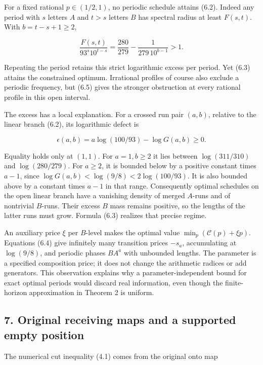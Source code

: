 For a fixed rational \(p\in(1/2,1)\), no periodic schedule attains (6.2). Indeed any period with \(s\) letters \(A\) and \(t>s\) letters \(B\) has spectral radius at least \(F(s,t)\). With \(b=t-s+1\ge2\),

\[
\boxed{
\frac{F(s,t)}{93^s10^{t-s}}
=\frac{280}{279}-\frac{1}{279\,10^{b-1}}>1.
}
\tag{6.5}
\]

Repeating the period retains this strict logarithmic excess per period. Yet (6.3) attains the constrained optimum. Irrational profiles of course also exclude a periodic frequency, but (6.5) gives the stronger obstruction at every rational profile in this open interval.

The excess has a local explanation. For a crossed run pair \((a,b)\), relative to the linear branch (6.2), its logarithmic defect is

\[
\epsilon(a,b)=a\log(100/93)-\log G(a,b)\ge0.
\tag{6.6}
\]

Equality holds only at \((1,1)\). For \(a=1,b\ge2\) it lies between \(\log(311/310)\) and \(\log(280/279)\). For \(a\ge2\), it is bounded below by a positive constant times \(a-1\), since \(\log G(a,b)<\log(9/8)<2\log(100/93)\). It is also bounded above by a constant times \(a-1\) in that range. Consequently optimal schedules on the open linear branch have a vanishing density of merged \(A\)-runs and of nontrivial \(B\)-runs. Their excess \(B\) mass remains positive, so the lengths of the latter runs must grow. Formula (6.3) realizes that precise regime.

An auxiliary price \(\xi\) per \(B\)-level makes the optimal value \(\min_p(\mathcal C(p)+\xi p)\). Equations (6.4) give infinitely many transition prices \(-s_a\), accumulating at \(\log(9/8)\), and periodic phases \(BA^a\) with unbounded lengths. The parameter is a specified composition price; it does not change the arithmetic radices or add generators. This observation explains why a parameter-independent bound for exact optimal periods would discard real information, even though the finite-horizon approximation in Theorem 2 is uniform.

\subsection{7. Original receiving maps and a supported empty position}\label{original-receiving-maps-and-a-supported-empty-position}

The numerical cut inequality (4.1) comes from the original onto map

